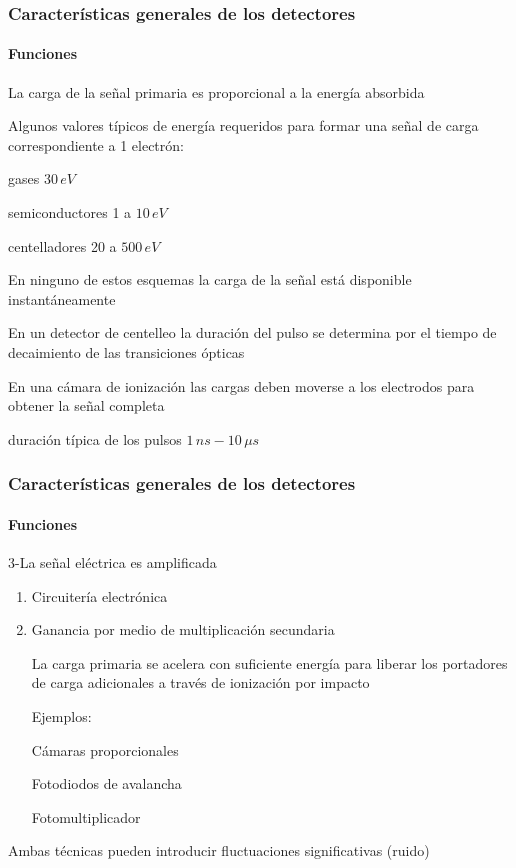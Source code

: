 \documentclass{beamer}
\begin{document}
\begin{frame}
\frametitle{Características generales de los detectores}
\framesubtitle{{\color{blue}Funciones}}
\small{{\color{blue}La carga de la señal primaria es proporcional a la energía
absorbida}}

\small{Algunos valores típicos de energía requeridos para formar una señal de carga
correspondiente a 1 electrón:}
\begin{center}
gases\hspace{2cm}   \alert{$30\,eV$}

semiconductores\hspace{1cm}   \alert{1 a $10\,eV$ }

centelladores\hspace{1.9cm}    \alert{20 a $500\,eV$}
\end{center}
\begin{alertblock}{\small{En ninguno de estos esquemas la carga de la señal está
disponible instantáneamente}}
\small{En un detector de centelleo la duración del pulso se determina por el tiempo de
decaimiento de las transiciones ópticas

En una cámara de ionización las cargas deben moverse a los electrodos para
obtener la señal completa}

\begin{center}
duración típica de los pulsos\hspace{.5cm} \alert{$1\,ns - 10\,\mu s$}  
\end{center}
\end{alertblock}
\end{frame} 

\begin{frame}
\frametitle{Características generales de los detectores}
\framesubtitle{{\color{blue}Funciones}}
\begin{block}{3-La señal eléctrica es amplificada}
\begin{enumerate}
\item {\color[rgb]{0.5,0,0.13}Circuitería electrónica}
\item {\color[rgb]{0.5,0,0.13}Ganancia por medio de multiplicación secundaria}

La carga primaria se acelera con suficiente energía para liberar los portadores
de carga adicionales a través de ionización por impacto

Ejemplos:

\alert{Cámaras proporcionales}

\alert{Fotodiodos de avalancha}

\alert{Fotomultiplicador}
\end{enumerate}
\end{block}
\begin{alertblock}{}
Ambas técnicas pueden introducir fluctuaciones significativas (ruido)
\end{alertblock}
\end{frame} 
\end{document}
